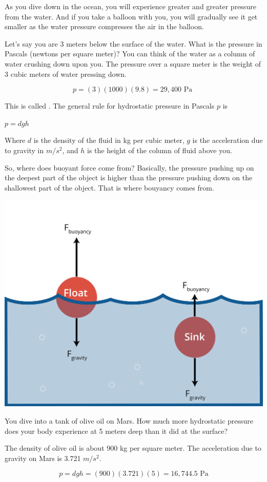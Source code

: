 As you dive down in the ocean, you will experience greater and
greater pressure from the water. And if you take a balloon with you, you
will gradually see it get smaller as the water pressure compresses the
air in the balloon.

Let's say you are 3 meters below the surface of the water. What is the
pressure in Pascals (newtons per square meter)? You can think of the
water as a column of water crushing down upon you. The pressure over
a square meter is the weight of 3 cubic meters of water pressing down.

$$p = (3)(1000)(9.8) = 29,400 \text{ Pa }$$

This is called . The general rule for
hydrostatic pressure in Pascals $p$ is

$p = d g h$

Where  $d$ is the density of the fluid
in kg per cubic meter, $g$ is the acceleration due to gravity in
$m/s^2$, and $h$ is the height of the column of fluid above you.

So, where does buoyant force come from? Basically, the pressure pushing up on the
deepest part of the object is higher than the pressure pushing down on
the shallowest part of the object. That is where bouyancy comes from.

\includegraphics[width=.7\textwidth]{buoyancy.png}

\begin{Exercise}[title={Hydrostatic Pressure}, label=mars_pressure]

  You dive into a tank of olive oil on Mars. How much more
  hydrostatic pressure does your body experience at 5 meters deep than
  it did at the surface?

  The density of olive oil is about 900 kg per square meter. The
  acceleration due to gravity on Mars is 3.721 $m/s^2$.
  
\end{Exercise}
\begin{Answer}[ref=mars_pressure]
$$p = d g h = (900)(3.721)(5) = 16,744.5 \text{ Pa}$$
\end{Answer}

